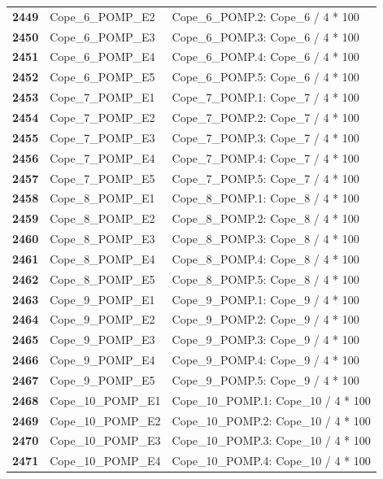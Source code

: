 \documentclass[
  letterpaper,
  DIV=11,
  numbers=noendperiod]{scrartcl}
\begin{document}
\begin{longtable}[t]{>{}cll}
\textbf{2449} & Cope\_6\_POMP\_E2 & Cope\_6\_POMP.2: Cope\_6 / 4 * 100\\
\textbf{2450} & Cope\_6\_POMP\_E3 & Cope\_6\_POMP.3: Cope\_6 / 4 * 100\\
\addlinespace
\textbf{2451} & Cope\_6\_POMP\_E4 & Cope\_6\_POMP.4: Cope\_6 / 4 * 100\\
\textbf{2452} & Cope\_6\_POMP\_E5 & Cope\_6\_POMP.5: Cope\_6 / 4 * 100\\
\textbf{2453} & Cope\_7\_POMP\_E1 & Cope\_7\_POMP.1: Cope\_7 / 4 * 100\\
\textbf{2454} & Cope\_7\_POMP\_E2 & Cope\_7\_POMP.2: Cope\_7 / 4 * 100\\
\textbf{2455} & Cope\_7\_POMP\_E3 & Cope\_7\_POMP.3: Cope\_7 / 4 * 100\\
\addlinespace
\textbf{2456} & Cope\_7\_POMP\_E4 & Cope\_7\_POMP.4: Cope\_7 / 4 * 100\\
\textbf{2457} & Cope\_7\_POMP\_E5 & Cope\_7\_POMP.5: Cope\_7 / 4 * 100\\
\textbf{2458} & Cope\_8\_POMP\_E1 & Cope\_8\_POMP.1: Cope\_8 / 4 * 100\\
\textbf{2459} & Cope\_8\_POMP\_E2 & Cope\_8\_POMP.2: Cope\_8 / 4 * 100\\
\textbf{2460} & Cope\_8\_POMP\_E3 & Cope\_8\_POMP.3: Cope\_8 / 4 * 100\\
\addlinespace
\textbf{2461} & Cope\_8\_POMP\_E4 & Cope\_8\_POMP.4: Cope\_8 / 4 * 100\\
\textbf{2462} & Cope\_8\_POMP\_E5 & Cope\_8\_POMP.5: Cope\_8 / 4 * 100\\
\textbf{2463} & Cope\_9\_POMP\_E1 & Cope\_9\_POMP.1: Cope\_9 / 4 * 100\\
\textbf{2464} & Cope\_9\_POMP\_E2 & Cope\_9\_POMP.2: Cope\_9 / 4 * 100\\
\textbf{2465} & Cope\_9\_POMP\_E3 & Cope\_9\_POMP.3: Cope\_9 / 4 * 100\\
\addlinespace
\textbf{2466} & Cope\_9\_POMP\_E4 & Cope\_9\_POMP.4: Cope\_9 / 4 * 100\\
\textbf{2467} & Cope\_9\_POMP\_E5 & Cope\_9\_POMP.5: Cope\_9 / 4 * 100\\
\textbf{2468} & Cope\_10\_POMP\_E1 & Cope\_10\_POMP.1: Cope\_10 / 4 * 100\\
\textbf{2469} & Cope\_10\_POMP\_E2 & Cope\_10\_POMP.2: Cope\_10 / 4 * 100\\
\textbf{2470} & Cope\_10\_POMP\_E3 & Cope\_10\_POMP.3: Cope\_10 / 4 * 100\\
\addlinespace
\textbf{2471} & Cope\_10\_POMP\_E4 & Cope\_10\_POMP.4: Cope\_10 / 4 * 100\\

\end{longtable}
\end{document}
